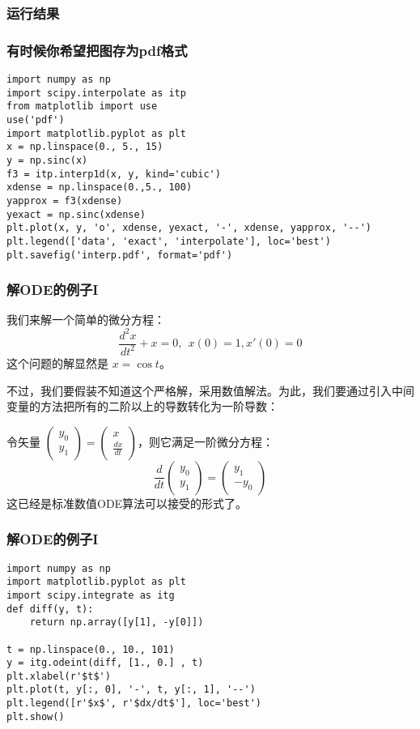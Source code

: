 \documentclass[CJK,13pt]{beamer}
\begin{document}
\begin{frame}
  \frametitle{运行结果}
\end{frame}

\begin{frame}[fragile]
  \frametitle{有时候你希望把图存为pdf格式}
\begin{verbatim}
import numpy as np
import scipy.interpolate as itp
from matplotlib import use
use('pdf')
import matplotlib.pyplot as plt
x = np.linspace(0., 5., 15)
y = np.sinc(x)
f3 = itp.interp1d(x, y, kind='cubic')
xdense = np.linspace(0.,5., 100)
yapprox = f3(xdense)
yexact = np.sinc(xdense)
plt.plot(x, y, 'o', xdense, yexact, '-', xdense, yapprox, '--')
plt.legend(['data', 'exact', 'interpolate'], loc='best')
plt.savefig('interp.pdf', format='pdf')
\end{verbatim}        
\ecode
\end{frame}



\begin{frame}
  \frametitle{解ODE的例子I}
  我们来解一个简单的微分方程：
  $$ \frac{d^2x}{dt^2} + x = 0,\ \ x(0) = 1, x'(0) = 0$$
  这个问题的解显然是 $x = \cos t$。

  不过，我们要假装不知道这个严格解，采用数值解法。为此，我们要通过引入中间变量的方法把所有的二阶以上的导数转化为一阶导数：

  令矢量 $\begin{pmatrix} y_0 \\ y_1\end{pmatrix} = \begin{pmatrix} x \\ \frac{dx}{dt} \end{pmatrix}$，则它满足一阶微分方程：
    $$   \frac{d}{dt}\begin{pmatrix} y_0 \\ y_1\end{pmatrix} =\begin{pmatrix} y_1 \\ -y_0\end{pmatrix} $$
      这已经是标准数值ODE算法可以接受的形式了。
\end{frame}

\begin{frame}[fragile]
  \frametitle{解ODE的例子I}
\begin{Verbatim}[obeytabs, tabsize=4]
import numpy as np
import matplotlib.pyplot as plt
import scipy.integrate as itg
def diff(y, t):
	return np.array([y[1], -y[0]])

t = np.linspace(0., 10., 101)
y = itg.odeint(diff, [1., 0.] , t)
plt.xlabel(r'$t$')
plt.plot(t, y[:, 0], '-', t, y[:, 1], '--')
plt.legend([r'$x$', r'$dx/dt$'], loc='best')
plt.show()
\end{Verbatim}        
\ecode

\end{frame}
\end{document}
